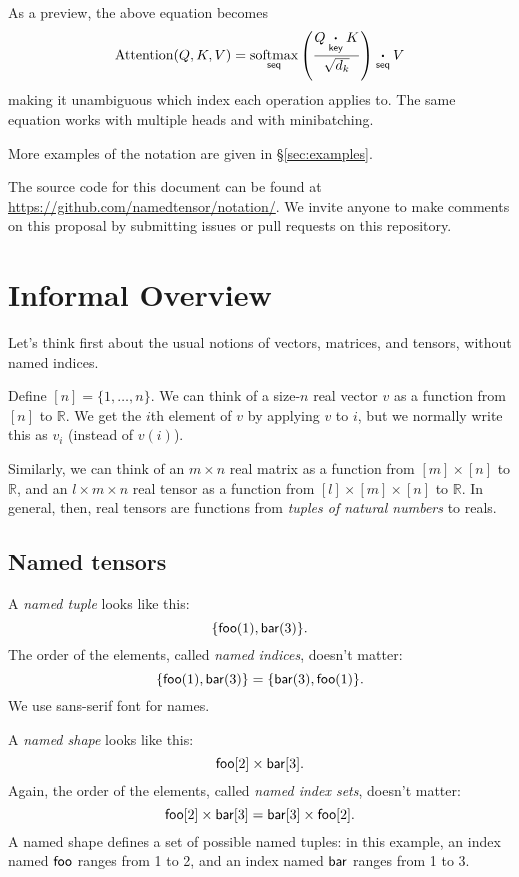 \documentclass{article}
\newcommand{\tuple}[1]{\{#1\}}
\begin{document}
As a preview, the above equation becomes
\begin{equation*}
  \text{Attention}(Q,K,V) = \nfun{seq}{softmax} \left( \frac{Q \ndot{key} K}{\sqrt{d_k}} \right) \ndot{seq} V
\end{equation*}
making it unambiguous which index each operation applies to. The same equation works with multiple heads and with minibatching.

More examples of the notation are given in \S\ref{sec:examples}.

The source code for this document can be found at \url{https://github.com/namedtensor/notation/}. We invite anyone to make comments on this proposal by submitting issues or pull requests on this repository.

\section{Informal Overview}
\label{sec:intro}

Let's think first about the usual notions of vectors, matrices, and tensors, without named indices.

Define $[n] = \{1, \ldots, n\}$. We can think of a size-$n$ real vector $v$ as a function from $[n]$ to $\mathbb{R}$. We get the $i$th element of $v$ by applying $v$ to $i$, but we normally write this as $v_i$ (instead of $v(i)$). 

Similarly, we can think of an $m \times n$ real matrix as a function from $[m] \times [n]$ to $\mathbb{R}$, and an $l \times m \times n$ real tensor as a function from $[l] \times [m] \times [n]$ to $\mathbb{R}$. In general, then, real tensors are functions from \emph{tuples of natural numbers} to reals.

\subsection{Named tensors}

A \emph{named tuple} looks like this: \[\tuple{\nidx{foo}{1}, \nidx{bar}{3}}.\] The order of the elements, called \emph{named indices}, doesn't matter: \[\tuple{\nidx{foo}{1}, \nidx{bar}{3}} = \tuple{\nidx{bar}{3}, \nidx{foo}{1}}.\] We use \textsf{sans-serif} font for names.

A \emph{named shape} looks like this: \[\nset{foo}{2} \times \nset{bar}{3}.\] Again, the order of the elements, called \emph{named index sets}, doesn't matter: \[\nset{foo}{2} \times \nset{bar}{3} = \nset{bar}{3} \times \nset{foo}{2}.\] A named shape defines a set of possible named tuples: in this example, an index named $\name{foo}$ ranges from 1 to 2, and an index named $\name{bar}$ ranges from 1 to 3.
\end{document}
